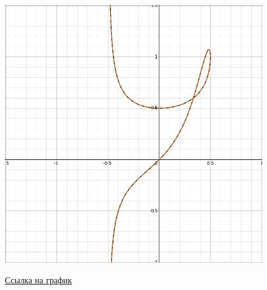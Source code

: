 \begin{figure}[H]
    \centering
    \includegraphics[trim={0 0 0 0},clip,width=\textwidth]{Imgs/Plot.png}
    \label{pict}
    \caption{\href{https://www.desmos.com/calculator/8axpewyf19}{Ссылка на график}}
\end{figure}

